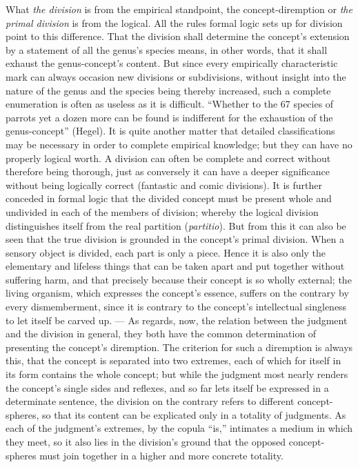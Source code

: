 \documentclass[12pt]{book}
\begin{document}
What \emph{the division} is from the empirical standpoint, the
concept-diremption or \emph{the primal division} is from the logical. All
the rules formal logic sets up for division point to this difference. That
the division shall determine the concept's extension by a statement of all
the genus's species means, in other words, that it shall exhaust the
genus-concept's content. But since every empirically characteristic mark can
always occasion new divisions or subdivisions, without insight into the
nature of the genus and the species being thereby increased, such a complete
enumeration is often as useless as it is difficult. ``Whether to the 67
species of parrots yet a dozen more can be found is indifferent for the
exhaustion of the genus-concept'' (Hegel). It is quite another matter that
detailed classifications may be necessary in order to complete empirical
knowledge; but they can have no properly logical worth. A division can often
be complete and correct without therefore being thorough, just as conversely
it can have a deeper significance without being logically correct (fantastic
and comic divisions). It is further conceded in formal logic that the
divided concept must be present whole and undivided in each of the members
of division; whereby the logical division distinguishes itself from the real
partition (\textit{partitio}). But from this it can also be seen that the
true division is grounded in the concept's primal division. When a sensory
object is divided, each part is only a piece. Hence it is also only the
elementary and lifeless things that can be taken apart and put together
without suffering harm, and that precisely because their concept is so
wholly external; the living organism, which expresses the concept's essence,
suffers on the contrary by every dismemberment, since it is contrary to the
concept's intellectual singleness to let itself be carved up. --- As
regards, now, the relation between the judgment and the division in general,
they both have the common determination of presenting the concept's
diremption. The criterion for such a diremption is always this, that the
concept is separated into two extremes, each of which for itself in its form
contains the whole concept; but while the judgment most nearly renders the
concept's single sides and reflexes, and so far lets itself be expressed in
a determinate sentence, the division on the contrary refers to different
concept-spheres, so that its content can be explicated only in a totality of
judgments. As each of the judgment's extremes, by the copula ``is,''
intimates a medium in which they meet, so it also lies in the division's
ground that the opposed concept-spheres must join together in a higher and
more concrete totality.
\end{document}
